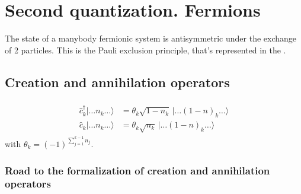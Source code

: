 \documentclass[letterpaper,10pt,english]{jupyterBook}
\begin{document}
\section{Second quantization. Fermions}
\label{\detokenize{ch/quantum-mechanics/many-body/fermions:second-quantization-fermions}}\label{\detokenize{ch/quantum-mechanics/many-body/fermions:quantum-mechanics-second-quantizazion-fermions}}\label{\detokenize{ch/quantum-mechanics/many-body/fermions::doc}}
\sphinxAtStartPar
The state of a many\sphinxhyphen{}body fermionic system is anti\sphinxhyphen{}symmetric under the exchange of 2 particles. This is the Pauli exclusion principle, that’s represented in the {\hyperref[\detokenize{ch/quantum-mechanics/many-body/fermions:quantum-mechanics-second-quantizazion-fermions-car}]{}}.


\subsection{Creation and annihilation operators}
\label{\detokenize{ch/quantum-mechanics/many-body/fermions:creation-and-annihilation-operators}}\label{\detokenize{ch/quantum-mechanics/many-body/fermions:quantum-mechanics-second-quantizazion-fermions-creation-annihilation}}\begin{equation*}
\begin{split}\begin{aligned}
\hat c^\dagger_k|\dots n_k\dots\rangle & = \theta_k\sqrt{1-n_k}\,|\dots(1-n)_k\dots\rangle \\
\hat c_k|\dots n_k\dots\rangle & = \theta_k\sqrt{n_k}\,|\dots(1-n)_k\dots\rangle
\end{aligned}\end{split}
\end{equation*}
\sphinxAtStartPar
with \(\theta_k=(-1)^{\sum_{j=1}^{k-1} n_j}\).
\subsubsection*{Road to the formalization of creation and annihilation operators}
\end{document}
